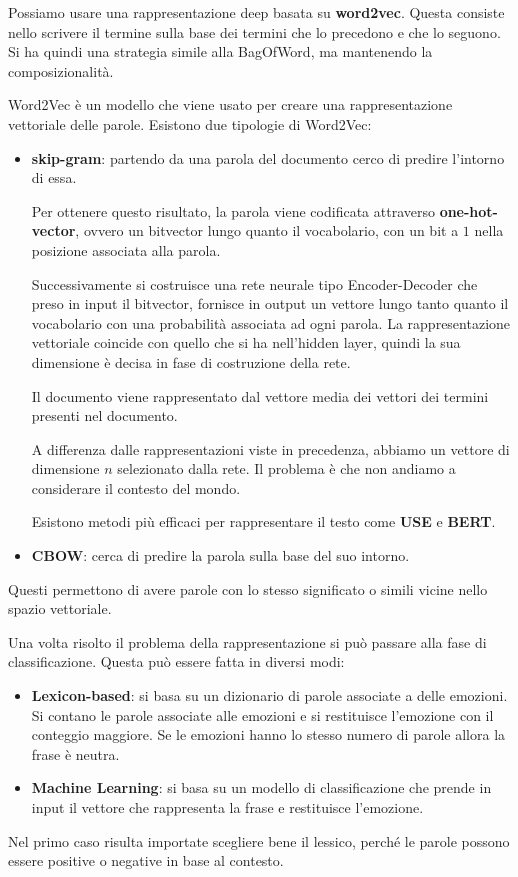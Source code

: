 Possiamo usare una rappresentazione deep basata su \textbf{word2vec}. Questa consiste
nello scrivere il termine sulla base dei termini che lo precedono e che lo seguono.
Si ha quindi una strategia simile alla BagOfWord, ma mantenendo la composizionalità.

Word2Vec è un modello che viene usato per creare una rappresentazione vettoriale
delle parole. Esistono due tipologie di Word2Vec:
\begin{itemize}
      \item \textbf{skip-gram}: partendo da una parola del documento cerco di
            predire l'intorno di essa.

            Per ottenere questo risultato, la parola viene codificata attraverso
            \textbf{one-hot-vector}, ovvero un bitvector lungo quanto il
            vocabolario, con un bit a $1$ nella posizione associata alla parola.

            Successivamente si costruisce una rete neurale tipo Encoder-Decoder
            che preso in input il bitvector, fornisce in output un vettore
            lungo tanto quanto il vocabolario con una probabilità associata ad
            ogni parola. La rappresentazione vettoriale coincide con quello che
            si ha nell'hidden layer, quindi la sua dimensione è decisa in fase di
            costruzione della rete.

            Il documento viene rappresentato dal vettore media dei vettori dei
            termini presenti nel documento.

            A differenza dalle rappresentazioni viste in precedenza, abbiamo un
            vettore di dimensione $n$ selezionato dalla rete. Il problema è che
            non andiamo a considerare il contesto del mondo.

            Esistono metodi più efficaci per rappresentare il testo come
            \textbf{USE} e \textbf{BERT}.
      \item \textbf{CBOW}: cerca di predire la parola sulla base del suo intorno.
\end{itemize}
Questi permettono di avere parole con lo stesso significato o simili vicine nello
spazio vettoriale.

Una volta risolto il problema della rappresentazione si può passare alla fase
di classificazione. Questa può essere fatta in diversi modi:
\begin{itemize}
      \item \textbf{Lexicon-based}: si basa su un dizionario di parole associate
            a delle emozioni. Si contano le parole associate alle emozioni e si
            restituisce l'emozione con il conteggio maggiore. Se le emozioni hanno
            lo stesso numero di parole allora la frase è neutra.
      \item \textbf{Machine Learning}: si basa su un modello di classificazione
            che prende in input il vettore che rappresenta la frase e restituisce
            l'emozione.
\end{itemize}
\begin{nota}
      Nel primo caso risulta importate scegliere bene il lessico, perché le parole
      possono essere positive o negative in base al contesto.
\end{nota}
